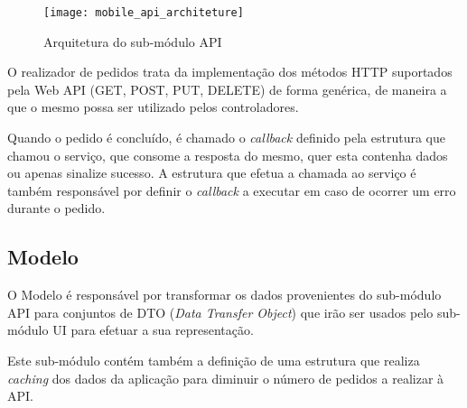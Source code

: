 \begin{figure}[h]
	\centering
	\texttt{[image: mobile\_api\_architeture]}
	\caption{Arquitetura do sub-módulo API}
\end{figure}

O realizador de pedidos trata da implementação dos métodos HTTP suportados pela Web API (GET, POST, PUT, DELETE) de forma genérica, de maneira a que o mesmo possa ser utilizado pelos controladores.

Quando o pedido é concluído, é chamado o \textit{callback} definido pela estrutura que chamou o serviço, que consome a resposta do mesmo, quer esta contenha dados ou apenas sinalize sucesso. A estrutura que efetua a chamada ao serviço é também responsável por definir o \textit{callback} a executar em caso de ocorrer um erro durante o pedido.

\subsection{Modelo}

O Modelo é responsável por transformar os dados provenientes do sub-módulo API para conjuntos de DTO (\textit{Data Transfer Object}) que irão ser usados pelo sub-módulo UI para efetuar a sua representação.

\medskip

Este sub-módulo contém também a definição de uma estrutura que realiza \textit{caching} dos dados da aplicação para diminuir o número de pedidos a realizar à API.